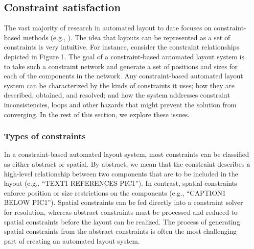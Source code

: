    \subsection{Constraint satisfaction}
    \label{constraint-satisfaction}

    The vast majority of research in automated layout to date focuses on
    constraint-based methods (e.g.,
    \citep{vanderzanden-1,borning-1,graf-1,hudson-3,kochhar-1,hudson-2,weitzman-2,myers-2}).
    The idea that layouts can be represented as a set of constraints is very
    intuitive. For instance, consider the constraint relationships depicted in
    Figure 1. The goal of a constraint-based automated layout system is to take
    such a constraint network and generate a set of positions and sizes for
    each of the components in the network. Any constraint-based automated
    layout system can be characterized by the kinds of constraints it uses; how
    they are described, obtained, and resolved; and how the system addresses
    constraint inconsistencies, loops and other hazards that might prevent the
    solution from converging. In the rest of this section, we explore these
    issues.

    \subsubsection{Types of constraints}

     In a constraint-based automated layout system, most constraints can be
     classified as either abstract or spatial. By abstract, we mean that the
     constraint describes a high-level relationship between two components that
     are to be included in the layout (e.g., “TEXT1 REFERENCES PIC1”). In
     contrast, spatial constraints enforce position or size restrictions on the
     components (e.g., “CAPTION1 BELOW PIC1”). Spatial constraints can be fed
     directly into a constraint solver for resolution, whereas abstract
     constraints must be processed and reduced to spatial constraints before the
     layout can be realized. The process of generating spatial constraints from
     the abstract constraints is often the most challenging part of creating an
     automated layout system.

